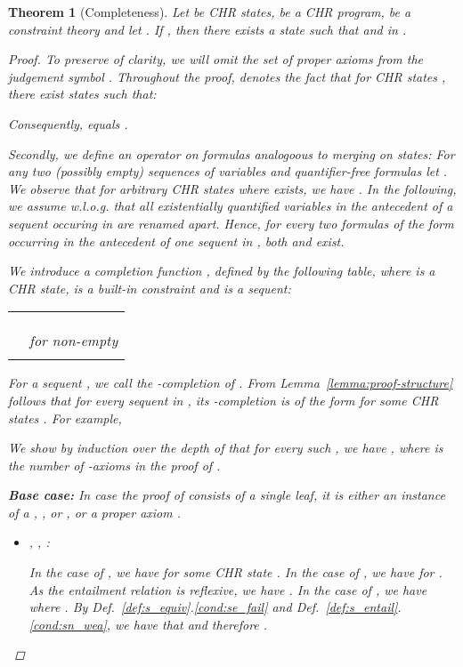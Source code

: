 \documentclass[acmtocl]{acmtrans2m}
\newtheorem{theorem}{Theorem}[section]
\begin{document}
\begin{theorem}[Completeness]
\label{thm:completeness}
   Let  be CHR states,  be a CHR program,  be a constraint theory
   and let  . If , then there
   exists a state  such that  and  in .
\begin{proof}
To preserve of clarity, we will omit the set  of proper axioms from the
judgement symbol . Throughout the proof,  denotes
the fact that for CHR states , there exist states  such that:
	
Consequently,  equals .

Secondly, we define an operator on formulas analogoous to merging on states: For
any two (possibly empty) sequences of variables  and quantifier-free formulas  let
.
We observe that for arbitrary CHR states  where  exists, we
have .
In the following, we assume w.l.o.g. that all existentially quantified variables
in the antecedent of a sequent occuring in  are renamed apart. Hence, for
every two formulas of the form  occurring in
the antecedent of one sequent in , both  and 
exist.

We introduce a completion function , defined by the following table,
where  is a CHR state,  is a built-in constraint and
 is a sequent:

	\medskip
	\begin{tabular}{l @{\hspace{1mm}  \hspace{1mm}} l}
	   &  \\
	   &  \\
	   &  \\
	   & 
	  	\quad for non-empty  \\
	   &  \\
	\end{tabular}

\medskip
For a sequent , we call  the
-completion of . From Lemma~\ref{lemma:proof-structure}
follows that for every sequent  in , its
-completion  is of the form  for
some CHR states . For example,
	

	We show by induction over the depth of  that for every such
	, we have , where  is the number of
	-axioms in the proof of .

	\textbf{Base case:}
	In case the proof of  consists of a single leaf, it is either an
	instance of a , , or , or a proper axiom
	.

	\begin{itemize}
	    \item , , :
	    	
	    In the case of , we have  for some CHR state . In the case of , we have
	     for . As the
	    entailment relation is reflexive, we have . In the case of
	    , we have  where .
	    By  Def.~\ref{def:s_equiv}.\ref{cond:se_fail} and
	    Def.~\ref{def:s_entail}.\ref{cond:sn_wea}, we have that  and
	    therefore .


\end{itemize}
\end{proof}
\end{theorem}
\end{document}
